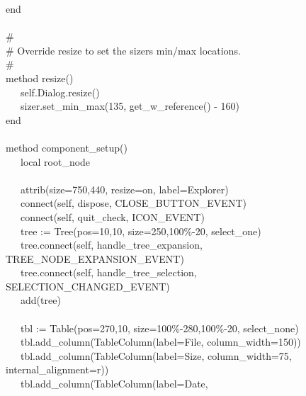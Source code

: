 {\>   end \\
\ \\
\>   \# \\
\>   \# Override resize to set the sizer{\textquotesingle}s min/max
locations. \\
\>   \# \\
\>   method resize() \\
\>   \ \ \ self.Dialog.resize() \\
\>   \ \ \ sizer.set\_min\_max(135, get\_w\_reference() - 160) \\
\>   end \\
\ \\
\>   method component\_setup() \\
\>   \ \ \ local root\_node \\
\ \\
\>   \ \ \ attrib({\textquotedbl}size=750,440{\textquotedbl},
{\textquotedbl}resize=on{\textquotedbl},
{\textquotedbl}label=Explorer{\textquotedbl}) \\
\>   \ \ \ connect(self, {\textquotedbl}dispose{\textquotedbl},
CLOSE\_BUTTON\_EVENT) \\
\>   \ \ \ connect(self, {\textquotedbl}quit\_check{\textquotedbl},
ICON\_EVENT) \\
\>   \ \ \ tree := Tree({\textquotedbl}pos=10,10{\textquotedbl},
{\textquotedbl}size=250,100\%-20{\textquotedbl},
{\textquotedbl}select\_one{\textquotedbl}) \\
\>   \ \ \ tree.connect(self,
{\textquotedbl}handle\_tree\_expansion{\textquotedbl},
TREE\_NODE\_EXPANSION\_EVENT) \\
\>   \ \ \ tree.connect(self,
{\textquotedbl}handle\_tree\_selection{\textquotedbl},
SELECTION\_CHANGED\_EVENT) \\
\>   \ \ \ add(tree) \\
\ \\
\>   \ \ \ tbl := Table({\textquotedbl}pos=270,10{\textquotedbl},
{\textquotedbl}size=100\%-280,100\%-20{\textquotedbl},
{\textquotedbl}select\_none{\textquotedbl}) \\
\>   \ \ \ tbl.add\_column(TableColumn({\textquotedbl}label=File{\textquotedbl},
{\textquotedbl}column\_width=150{\textquotedbl})) \\
\>   \ \ \ tbl.add\_column(TableColumn({\textquotedbl}label=Size{\textquotedbl},
{\textquotedbl}column\_width=75{\textquotedbl},
{\textquotedbl}internal\_alignment=r{\textquotedbl})) \\
\>   \ \ \ tbl.add\_column(TableColumn({\textquotedbl}label=Date{\textquotedbl},
}
